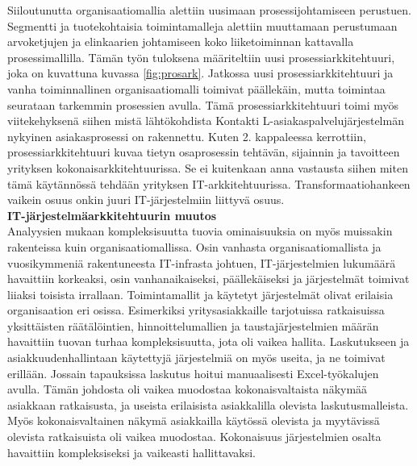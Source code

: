 \documentclass[finnish,12pt,a4paper,pdftex]{article}
\begin{document}
Siiloutunutta organisaatiomallia alettiin uusimaan prosessijohtamiseen perustuen. Segmentti ja tuotekohtaisia toimintamalleja alettiin muuttamaan perustumaan arvoketjujen ja elinkaarien johtamiseen koko liiketoiminnan kattavalla prosessimallilla. Tämän työn tuloksena määriteltiin uusi prosessiarkkitehtuuri, joka on kuvattuna kuvassa \ref{fig:prosark}. Jatkossa uusi prosessiarkkitehtuuri ja vanha toiminnallinen organisaatiomalli toimivat päällekäin, mutta toimintaa seurataan tarkemmin prosessien avulla. Tämä prosessiarkkitehtuuri toimi myös viitekehyksenä siihen mistä lähtökohdista Kontakti L-asiakaspalvelujärjestelmän nykyinen asiakasprosessi on rakennettu. Kuten 2. kappaleessa kerrottiin, prosessiarkkitehtuuri kuvaa tietyn osaprosessin tehtävän, sijainnin ja tavoitteen yrityksen kokonaisarkkitehtuurissa. Se ei kuitenkaan anna vastausta siihen miten tämä käytännössä tehdään yrityksen IT-arkkitehtuurissa. Transformaatiohankeen vaikein osuus onkin juuri IT-järjestelmiin liittyvä osuus.\\

\textbf{IT-järjestelmäarkkitehtuurin muutos}\\

Analyysien mukaan kompleksisuutta tuovia ominaisuuksia on myös muissakin rakenteissa kuin organisaatiomallissa. Osin vanhasta organisaatiomallista ja vuosikymmeniä rakentuneesta IT-infrasta johtuen, IT-järjestelmien lukumäärä havaittiin korkeaksi, osin vanhanaikaiseksi, päällekäiseksi ja järjestelmät toimivat liiaksi toisista irrallaan. Toimintamallit ja käytetyt järjestelmät olivat erilaisia organisaation eri osissa. Esimerkiksi yritysasiakkaille tarjotuissa ratkaisuissa yksittäisten räätälöintien, hinnoittelumallien ja taustajärjestelmien määrän havaittiin tuovan turhaa kompleksisuutta, jota oli vaikea hallita. Laskutukseen ja asiakkuudenhallintaan käytettyjä järjestelmiä on myös useita, ja ne toimivat erillään. Jossain tapauksissa laskutus hoitui manuaalisesti Excel-työkalujen avulla. Tämän johdosta oli vaikea muodostaa kokonaisvaltaista näkymää asiakkaan ratkaisusta, ja useista erilaisista asiakkalilla olevista laskutusmalleista. Myös kokonaisvaltainen näkymä asiakkailla käytössä olevista ja myytävissä olevista ratkaisuista oli vaikea muodostaa.  Kokonaisuus järjestelmien osalta havaittiin kompleksiseksi ja vaikeasti hallittavaksi.\\
\end{document}
